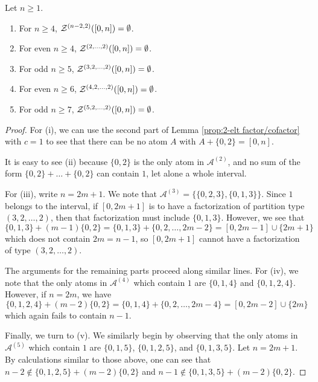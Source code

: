 \begin{prop} \label{prop:bad types}
	Let $n\ge 1$.
	\begin{enumerate}[label={\rm (\roman{*})}]
		\item For $n\ge 4$, $\mathcal{Z}^{(n-2,2)}([ 0,n ]) = \emptyset$.
		\item For even $n\ge 4$, $\mathcal{Z}^{(2,\dots,2)}([ 0,n ]) = \emptyset$.
		\item For odd $n\ge 5$, $\mathcal{Z}^{(3,2,\dots, 2)}([ 0,n ]) = \emptyset$.
		\item For even $n\ge 6$, $\mathcal{Z}^{(4,2,\dots, 2)}([ 0,n ]) = \emptyset$.
		\item For odd $n\ge 7$, $\mathcal{Z}^{(5,2,\dots, 2)}([ 0,n ]) = \emptyset$.
	\end{enumerate}
\end{prop}
\begin{proof}
	For (i), we can use the second part of Lemma \ref{prop:2-elt factor/cofactor} with $c = 1$ to see that there can be no atom $A$ with $A+\{0,2\} = [ 0,n ]$.
	
	It is easy to see (ii) because $\{0,2\}$ is the only atom in $\mathcal{A}^{(2)}$, and no sum of the form $\{0,2\} +\dots +\{0,2\}$ can contain $1$, let alone a whole interval.
	
	For (iii), write $n = 2m+1$.
	We note that $\mathcal{A}^{(3)} = \{\{0,2,3\}, \{0,1,3\} \}$.
	Since $1$ belongs to the interval, if $[ 0,2m+1 ]$ is to have a factorization of partition type $(3,2,\dots,2)$, then that factorization must include $\{0,1,3\}$.
	However, we see that 
	\[ \{0,1,3\} + (m-1)\{0,2\}  = \{0,1,3\} + \{0,2,\dots, 2m-2\} = [ 0, 2m-1 ] \cup \{2m+1\} \]
	which does not contain $2m = n-1$, so $[ 0,2m+1]$ cannot have a factorization of type $(3,2,\dots,2)$.
	
	The arguments for the remaining parts proceed along similar lines.
	For (iv), we note that the only atoms in $\mathcal{A}^{(4)}$ which contain $1$ are $\{0,1,4\}$ and $\{0,1,2,4\}$.
	However, if $n = 2m$, we have
	\[ \{0,1,2,4\} + (m-2)\{0,2\} = \{0,1,4\} + \{0,2,\dots, 2m-4\} = [ 0, 2m-2 ] \cup \{2m\} \]
	which again fails to contain $n-1$.
	
	Finally, we turn to (v).
	We similarly begin by observing that the only atoms in $\mathcal{A}^{(5)}$ which contain $1$ are $\{0,1,5\}$, $\{0,1,2,5\}$, and $\{0,1,3,5\}$.
	Let $n = 2m+1$.
	By calculations similar to those above, one can see that $n-2 \notin \{0,1,2,5\} +(m-2)\{0,2\}$ and $n-1\notin \{0,1,3,5\} + (m-2)\{0,2\}$.
\end{proof}


